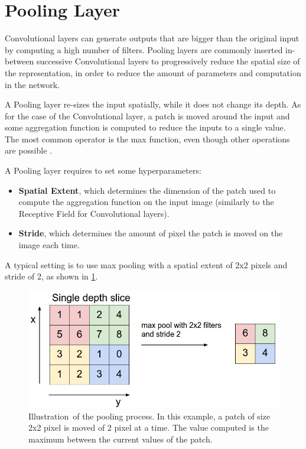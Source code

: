 \section{Pooling Layer}
\label{sec:pool_layer}

Convolutional layers can generate outputs that are bigger than the original input by computing a high number of filters.
Pooling layers are commonly inserted in-between successive Convolutional layers to progressively reduce the spatial size of the representation, in order to reduce the amount of parameters and computation in the network.

A Pooling layer re-sizes the input spatially, while it does not change its depth.
As for the case of the Convolutional layer, a patch is moved around the input and some aggregation function is computed to reduce the inputs to a single value.
The most common operator is the max function, even though other operations are possible \cite{CS231n}.

A Pooling layer requires to set some hyperparameters:
\begin{itemize}
    \item{\textbf{Spatial Extent}, which determines the dimension of the patch used to compute the aggregation function on the input image (similarly to the Receptive Field for Convolutional layers).}
    \item{\textbf{Stride}, which determines the amount of pixel the patch is moved on the image each time.}
\end{itemize}
A typical setting is to use max pooling with a spatial extent of 2x2 pixels and stride of 2, as shown in \cref{fig:pooling}.

\begin{figure}[ht]
	\centering
	\includegraphics[scale=0.30]{figures/pooling}
	\caption{Illustration\protect\footnotemark ~of the pooling process. In this example, a patch of size 2x2 pixel is moved of 2 pixel at a time. The value computed is the maximum between the current values of the patch.}
	\label{fig:pooling}
\end{figure}
